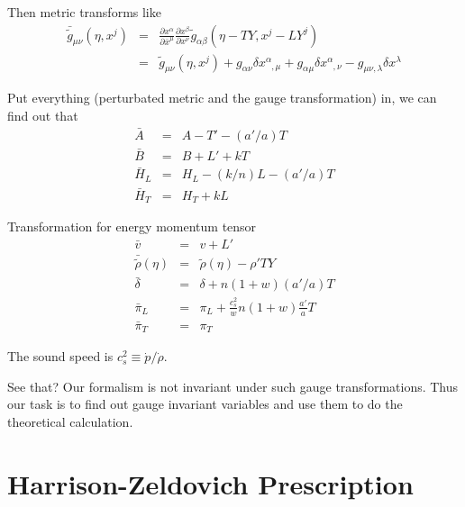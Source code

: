 \documentclass[12pt,a4paper]{book}
\begin{document}
Then metric transforms like
\begin{eqnarray}
	\bar{\tilde g} _{\mu\nu}(\eta,x^j) &=& \frac{\partial x^\alpha}{\partial{\bar x^\mu}} \frac{\partial x^\beta }{\partial x^\nu} \tilde g_{\alpha\beta}(\eta-T Y, x^j - L Y^j)  \\
	&=& \tilde g_{\mu\nu}(\eta,x^j) + g_{\alpha\nu}\delta x^\alpha_{\phantom\alpha,\mu} + g_{\alpha\mu}\delta x^{\alpha}_{\phantom \alpha,\nu} - g_{\mu\nu,\lambda}\delta x^\lambda
\end{eqnarray}


Put everything (perturbated metric and the gauge transformation) in, we can find out that
\begin{eqnarray}
	\bar A&=& A- T' - (a'/a)T \\
	\bar B&=& B+L' + k T \\
	\bar H_L &=& H_L - (k/n) L - (a'/a)T \\
	\bar H_T &=& H_T + k L 
\end{eqnarray}

Transformation for energy momentum tensor
\begin{eqnarray}
	\bar v &=& v +L' \\
	\bar{\tilde \rho}(\eta) &=& \tilde \rho(\eta) - \rho' T Y \\
	\bar \delta &=& \delta + n(1+w)(a'/a) T   \\
	\bar \pi_L &=& \pi_L + \frac{c_s^2}{w} n(1+w)\frac{a'}{a} T \\
	\bar \pi_T &=& \pi_T
\end{eqnarray}

The sound speed is $c_s^2\equiv \dot p/\dot \rho$.

See that? Our formalism is not invariant under such gauge transformations. Thus our task is to find out gauge invariant variables and use them to do the theoretical calculation.



\subsubsection{}










\section{Harrison-Zeldovich Prescription}
\end{document}
